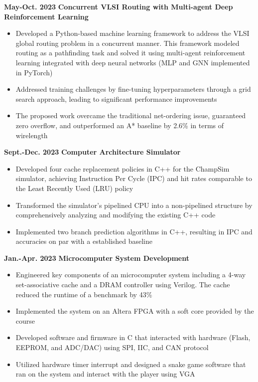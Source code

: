 \documentclass[11pt,a4paper,sans]{moderncv}
\begin{document}
\cventry
{\textnormal{\textbf{May-Oct. 2023}}}
{\textnormal{\textbf{Concurrent VLSI Routing with Multi-agent
Deep Reinforcement Learning}}}
{}{}{}
{
    \begin{itemize}
        \item Developed a Python-based machine learning framework to address the VLSI global routing problem in a concurrent manner. This framework modeled routing as a pathfinding task and solved it using multi-agent reinforcement learning integrated with deep neural networks (MLP and GNN implemented in PyTorch)
        \item Addressed training challenges by fine-tuning hyperparameters through a grid search approach, leading to significant performance improvements
        \item The proposed work overcame the traditional net-ordering issue, guaranteed zero overflow, and outperformed an A* baseline by 2.6\% in terms of wirelength
        \end{itemize}
}

\cventry
{\textnormal{\textbf{Sept.-Dec. 2023}}}
{\textnormal{\textbf{Computer Architecture Simulator}}}
{}{}{}
{
    \begin{itemize}
        \item Developed four cache replacement policies in C++ for the ChampSim simulator, achieving Instruction Per Cycle (IPC) and hit rates comparable to the Least Recently Used (LRU) policy
        \item Transformed the simulator's pipelined CPU into a non-pipelined structure by comprehensively analyzing and modifying the existing C++ code
        \item Implemented two branch prediction algorithms in C++, resulting in IPC and accuracies on par with a established baseline
    \end{itemize}
}

\cventry
{\textnormal{\textbf{Jan.-Apr. 2023}}}
{\textnormal{\textbf{Microcomputer System Development}}}
{}{}{}
{
    \begin{itemize}
    \item Engineered key components of an microcomputer system including a 4-way set-associative cache and a DRAM controller using Verilog. The cache reduced the runtime of a benchmark by 43\%
    \item Implemented the system on an Altera FPGA with a soft core provided by the course 
    \item Developed software and firmware in C that interacted with hardware (Flash, EEPROM, and ADC/DAC) using SPI, IIC, and CAN protocol 
    \item Utilized hardware timer interrupt and designed a snake game software that ran on the system and interact with the player using VGA
    \end{itemize}
}
\end{document}
